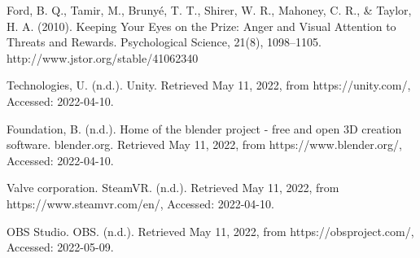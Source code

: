 \documentclass[letterpaper, 10 pt, conference]{ieeeconf}
\begin{document}
\begin{thebibliography}{99}
Ford, B. Q., Tamir, M., Brunyé, T. T., Shirer, W. R., Mahoney, C. R., \& Taylor, H. A. (2010). Keeping Your Eyes on the Prize: Anger and Visual Attention to Threats and Rewards. Psychological Science, 21(8), 1098–1105. http://www.jstor.org/stable/41062340

Technologies, U. (n.d.). Unity. Retrieved May 11, 2022, from https://unity.com/, Accessed: 2022-04-10.

Foundation, B. (n.d.). Home of the blender project - free and open 3D creation software. blender.org. Retrieved May 11, 2022, from https://www.blender.org/, Accessed: 2022-04-10.

Valve corporation. SteamVR. (n.d.). Retrieved May 11, 2022, from https://www.steamvr.com/en/, Accessed: 2022-04-10.

OBS Studio. OBS. (n.d.). Retrieved May 11, 2022, from https://obsproject.com/, Accessed: 2022-05-09.

\end{thebibliography}
\end{document}
